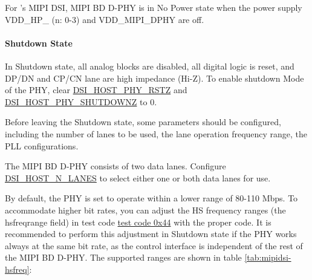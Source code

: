 \documentclass[main\_\_EN.tex]{subfiles}
\begin{document}
For \chipname{}'s MIPI DSI, MIPI BD D-PHY is in No Power state when the power supply VDD\_HP\_ (n: 0-3) and VDD\_MIPI\_DPHY are off.

\paragraph{Shutdown State}
In Shutdown state, all analog blocks are disabled, all digital logic is reset, and DP/DN and CP/CN lane are high impedance (Hi-Z). To enable shutdown Mode of the PHY, clear \hyperref[fielddesc:DSIHOSTPHYRSTZ]{DSI\_HOST\_PHY\_RSTZ} and \hyperref[fielddesc:DSIHOSTPHYSHUTDOWNZ]{DSI\_HOST\_PHY\_SHUTDOWNZ} to 0.

Before leaving the Shutdown state, some parameters should be configured, including the number of lanes to be used, the lane operation frequency range, the PLL configurations.

The MIPI BD D-PHY consists of two data lanes. Configure \hyperref[fielddesc:DSIHOSTNLANES]{DSI\_HOST\_N\_LANES} to select either one or both data lanes for use.

By default, the PHY is set to operate within a lower range of 80-110 Mbps. To accommodate higher bit rates, you can adjust the HS frequency ranges (the hsfreqrange field) in test code \hyperref[sec:test-code-0x44]{test code 0x44} with the proper code. It is recommended to perform this adjustment in Shutdown state if the PHY works always at the same bit rate, as the control interface is independent of the rest of the MIPI BD D-PHY. The supported ranges are shown in table \ref{tab:mipidsi-hsfreq}:
\end{document}

